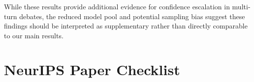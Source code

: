 \documentclass{article}
\begin{document}
While these results provide additional evidence for confidence escalation in multi-turn debates, the reduced model pool and potential sampling bias suggest these findings should be interpreted as supplementary rather than directly comparable to our main results.






\newpage %

\section*{NeurIPS Paper Checklist}

\end{document}

